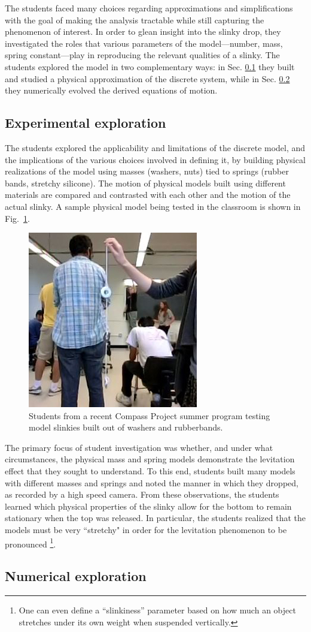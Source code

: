 \documentclass[pre,preprint,superscriptaddress,longbibliography]{revtex4-1}
\newcommand{\FIGstudents}{
\begin{figure}[t]\center
\includegraphics[width=\columnwidth]{./img/students_small.jpg}
\caption{\label{fig:students} Students from a recent Compass Project summer program testing model slinkies built out of washers and rubberbands.}
\end{figure}
}
\begin{document}
The students faced many choices regarding approximations and simplifications with the goal of making the analysis tractable while still capturing the phenomenon of interest. %
In order to glean insight into the slinky drop, they investigated the roles that various parameters of the model---number, mass, spring constant---play in reproducing the relevant qualities of a slinky.  The students explored the model in two complementary ways: in Sec. \ref{sec:discrete:exp} they built and studied a physical approximation of the discrete system, while in Sec. \ref{sec:discrete:num} they numerically evolved the derived equations of motion.

\subsection{Experimental exploration}
\label{sec:discrete:exp}
The students explored the applicability and limitations of the discrete model, and the implications of the various choices involved in defining it, by building physical realizations of the model using masses (washers, nuts) tied to springs (rubber bands, stretchy silicone). The motion of physical models built using different materials are compared and contrasted with each other and the motion of the actual slinky. A sample  physical model being tested in the classroom is shown in Fig.~\ref{fig:students}.  
\FIGstudents
The primary focus of student investigation was whether, and under what circumstances, the physical mass and spring models demonstrate the levitation effect that they sought to understand.  To this end, students built many models with different masses and springs and noted the manner in which they dropped, as recorded by a high speed camera. From these observations, the students learned which physical properties of the slinky allow for the bottom to remain stationary when the top was released.  In particular, the students realized that the models must be very ``stretchy" in order for the levitation phenomenon to be pronounced \footnote{One can even define a ``slinkiness'' parameter based on how much an object stretches under its own weight when suspended vertically.}.

\subsection{Numerical exploration}
\label{sec:discrete:num}
\end{document}
